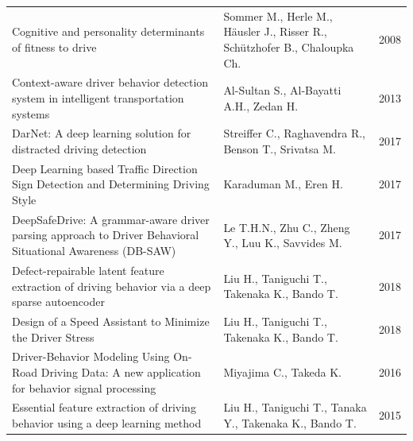 \documentclass[10pt,journal,compsoc]{IEEEtran}
\begin{document}
\begin{landscape}
\begin{table}[!t]
\begin{tabular}{p{12cm}ll}
Cognitive and personality determinants of fitness to drive                                                                                       & Sommer M., Herle M., Häusler J., Risser R., Schützhofer B., Chaloupka Ch.    & 2008                             \\
Context-aware driver behavior detection system in intelligent transportation systems                                                             & Al-Sultan S., Al-Bayatti A.H., Zedan H.                                      & 2013                             \\
DarNet: A deep learning solution for distracted driving detection                                                                                & Streiffer C., Raghavendra R., Benson T., Srivatsa M.                         & 2017                             \\
Deep Learning based Traffic Direction Sign Detection and Determining Driving Style                                                               & Karaduman M., Eren H.                                                        & 2017                             \\
DeepSafeDrive: A grammar-aware driver parsing approach to Driver Behavioral Situational Awareness (DB-SAW)                                       & Le T.H.N., Zhu C., Zheng Y., Luu K., Savvides M.                             & 2017                             \\
Defect-repairable latent feature extraction of driving behavior via a deep sparse autoencoder                                                    & Liu H., Taniguchi T., Takenaka K., Bando T.                                  & 2018                             \\
Design of a Speed Assistant to Minimize the Driver Stress                                                                                        & Liu H., Taniguchi T., Takenaka K., Bando T.                                  & 2018                             \\
Driver-Behavior Modeling Using On-Road Driving Data: A new application for behavior signal processing                                            & Miyajima C., Takeda K.                                                       & 2016                             \\
Essential feature extraction of driving behavior using a deep learning method                                                                    & Liu H., Taniguchi T., Tanaka Y., Takenaka K., Bando T.                       & 2015                             \\

\end{tabular}
\end{table}
\end{landscape}
\end{document}

